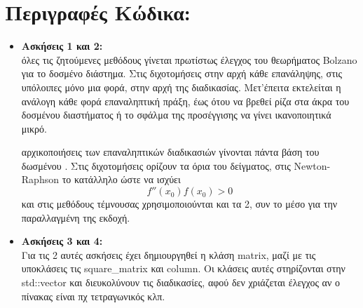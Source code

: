 \documentclass{article}
\newcommand{\lt}{\latintext}
\newcommand{\gt}{\greektext}
\begin{document}
\section{\gt Περιγραφές Κώδικα:}
\begin{itemize}
    \item \textbf{\gt Ασκήσεις 1 και 2:}\\
             όλες τις ζητούμενες μεθόδους γίνεται πρωτίστως έλεγχος του θεωρήματος
            \lt Bolzano \gt για το δοσμένο διάστημα. Στις διχοτομήσεις στην αρχή κάθε επανάληψης,
            \gt στις υπόλοιπες μόνο μια φορά, στην αρχή της διαδικασίας. Μετ'έπειτα εκτελείται
            \gt η ανάλογη κάθε φορά επαναληπτική πράξη, έως ότου να βρεθεί ρίζα στα άκρα του
            \gt δοσμένου διαστήματος ή το σφάλμα της προσέγγισης να γίνει ικανοποιητικά μικρό.
            
             αρχικοποιήσεις των επαναληπτικών διαδικασιών γίνονται πάντα βάση του δωσμένου
            . Στις διχοτομήσεις ορίζουν τα όρια του δείγματος, στις \lt Newton-Raphson
             το κατάλληλο ώστε να ισχύει 
            \begin{equation*}
                f''(x_{0})f(x_{0}) > 0
            \end{equation*} 
            \gt και στις μεθόδους τέμνουσας χρησιμοποιούνται και τα 2, συν το μέσο
            \gt για την παραλλαγμένη της εκδοχή.
    \item \textbf{\gt Ασκήσεις 3 και 4:}\\
            \gt Για τις 2 αυτές ασκήσεις έχει δημιουργηθεί η κλάση \lt matrix, \gt μαζί με τις
            \gt υποκλάσεις τις \lt square\_matrix \gt και \lt column. \gt Οι κλάσεις αυτές
            \gt στηρίζονται στην \lt std::vector \gt και διευκολύνουν τις διαδικασίες, αφού δεν
            \gt χριάζεται έλεγχος αν ο πίνακας είναι πχ τετραγωνικός κλπ.
            

\end{itemize}
\end{document}
